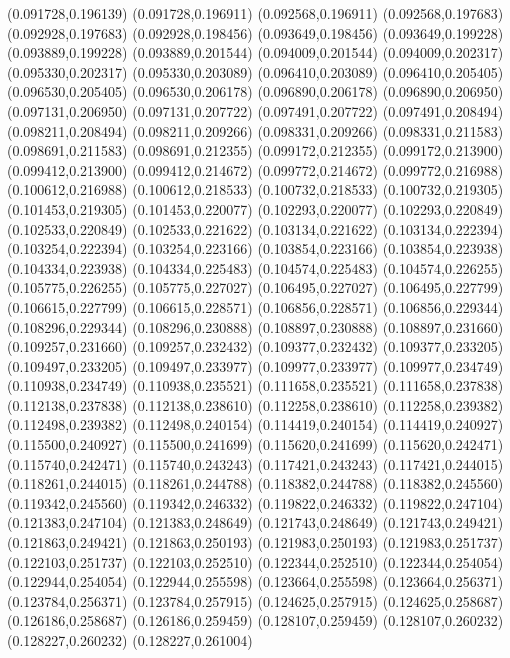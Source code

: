 (0.091728,0.196139)
(0.091728,0.196911)
(0.092568,0.196911)
(0.092568,0.197683)
(0.092928,0.197683)
(0.092928,0.198456)
(0.093649,0.198456)
(0.093649,0.199228)
(0.093889,0.199228)
(0.093889,0.201544)
(0.094009,0.201544)
(0.094009,0.202317)
(0.095330,0.202317)
(0.095330,0.203089)
(0.096410,0.203089)
(0.096410,0.205405)
(0.096530,0.205405)
(0.096530,0.206178)
(0.096890,0.206178)
(0.096890,0.206950)
(0.097131,0.206950)
(0.097131,0.207722)
(0.097491,0.207722)
(0.097491,0.208494)
(0.098211,0.208494)
(0.098211,0.209266)
(0.098331,0.209266)
(0.098331,0.211583)
(0.098691,0.211583)
(0.098691,0.212355)
(0.099172,0.212355)
(0.099172,0.213900)
(0.099412,0.213900)
(0.099412,0.214672)
(0.099772,0.214672)
(0.099772,0.216988)
(0.100612,0.216988)
(0.100612,0.218533)
(0.100732,0.218533)
(0.100732,0.219305)
(0.101453,0.219305)
(0.101453,0.220077)
(0.102293,0.220077)
(0.102293,0.220849)
(0.102533,0.220849)
(0.102533,0.221622)
(0.103134,0.221622)
(0.103134,0.222394)
(0.103254,0.222394)
(0.103254,0.223166)
(0.103854,0.223166)
(0.103854,0.223938)
(0.104334,0.223938)
(0.104334,0.225483)
(0.104574,0.225483)
(0.104574,0.226255)
(0.105775,0.226255)
(0.105775,0.227027)
(0.106495,0.227027)
(0.106495,0.227799)
(0.106615,0.227799)
(0.106615,0.228571)
(0.106856,0.228571)
(0.106856,0.229344)
(0.108296,0.229344)
(0.108296,0.230888)
(0.108897,0.230888)
(0.108897,0.231660)
(0.109257,0.231660)
(0.109257,0.232432)
(0.109377,0.232432)
(0.109377,0.233205)
(0.109497,0.233205)
(0.109497,0.233977)
(0.109977,0.233977)
(0.109977,0.234749)
(0.110938,0.234749)
(0.110938,0.235521)
(0.111658,0.235521)
(0.111658,0.237838)
(0.112138,0.237838)
(0.112138,0.238610)
(0.112258,0.238610)
(0.112258,0.239382)
(0.112498,0.239382)
(0.112498,0.240154)
(0.114419,0.240154)
(0.114419,0.240927)
(0.115500,0.240927)
(0.115500,0.241699)
(0.115620,0.241699)
(0.115620,0.242471)
(0.115740,0.242471)
(0.115740,0.243243)
(0.117421,0.243243)
(0.117421,0.244015)
(0.118261,0.244015)
(0.118261,0.244788)
(0.118382,0.244788)
(0.118382,0.245560)
(0.119342,0.245560)
(0.119342,0.246332)
(0.119822,0.246332)
(0.119822,0.247104)
(0.121383,0.247104)
(0.121383,0.248649)
(0.121743,0.248649)
(0.121743,0.249421)
(0.121863,0.249421)
(0.121863,0.250193)
(0.121983,0.250193)
(0.121983,0.251737)
(0.122103,0.251737)
(0.122103,0.252510)
(0.122344,0.252510)
(0.122344,0.254054)
(0.122944,0.254054)
(0.122944,0.255598)
(0.123664,0.255598)
(0.123664,0.256371)
(0.123784,0.256371)
(0.123784,0.257915)
(0.124625,0.257915)
(0.124625,0.258687)
(0.126186,0.258687)
(0.126186,0.259459)
(0.128107,0.259459)
(0.128107,0.260232)
(0.128227,0.260232)
(0.128227,0.261004)
